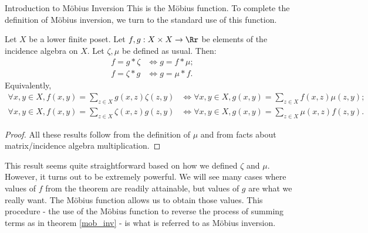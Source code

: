 \documentclass[12pt]{pom_thesis}
\begin{document}
\begin{chapter}{Introduction to M\"obius Inversion}
This is the M\"obius function. To complete the definition of M\"obius inversion, we turn to the standard use of this function. 
\begin{thm}\label{mob_inv}
Let $X$ be a lower finite poset. Let $f, g: X \times X \rightarrow \Rr$ be elements of the incidence algebra on $X$. Let $\zeta, \mu$ be defined as usual. Then:
\begin{align*}
f = g * \zeta &\iff g = f *\mu;\\
f = \zeta * g &\iff g = \mu * f.
\end{align*}
Equivalently,
\begin{align*}
\forall x,y \in X, f(x,y) = \sum_{z \in X}g(x,z)\zeta(z,y) &\iff \forall x,y \in X, g(x,y) = \sum_{z \in X}f(x,z)\mu(z,y);\\
\forall x,y \in X, f(x,y) = \sum_{z \in X}\zeta(x,z)g(z,y) &\iff \forall x,y \in X, g(x,y) = \sum_{z \in X}\mu(x,z)f(z,y).
\end{align*}
\begin{proof}
All these results follow from the definition of $\mu$ and from facts about matrix/incidence algebra multiplication.
\end{proof}
\end{thm}
This result seems quite straightforward based on how we defined $\zeta$ and $\mu$. However, it turns out to be extremely powerful. We will see many cases where values of $f$ from the theorem are readily attainable, but values of $g$ are what we really want. The M\"obius function allows us to obtain those values. This procedure - the use of the M\"obius function to reverse the process of summing terms as in theorem \ref{mob_inv} - is what is referred to as M\"obius inversion.


\end{chapter}
\end{document}
